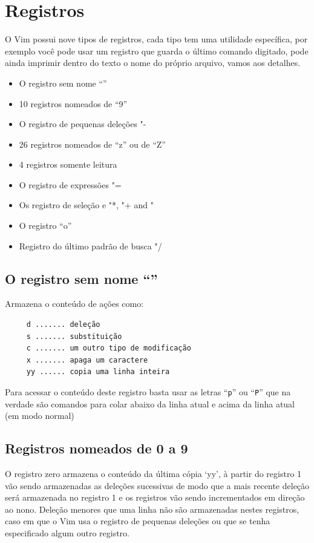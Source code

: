 \documentclass[10pt,a4paper,openany]{book}
\begin{document}
\chapter{Registros}
\label{Registros}

O Vim possui nove tipos de registros, cada tipo tem uma utilidade
específica, por exemplo você pode usar um registro que guarda o último
comando digitado, pode ainda imprimir dentro do texto o nome do
próprio arquivo, vamos aos detalhes.

\begin{itemize}
   \item O registro sem nome ``''
   \item 10 registros nomeados de ``9''
   \item O registro de pequenas deleções "-
   \item 26 registros nomeados de ``z'' ou de ``Z''
   \item 4 registros somente leitura
   \item O registro de expressões "=
   \item Os registro de seleção e  "*, "+ and "~
   \item O registro ``o''
   \item Registro do último padrão de busca "/
\end{itemize}

\section{O registro sem nome ``''}
\label{O registro sem nome ``''}

Armazena o conteúdo de ações como:

\begin{verbatim}
     d ....... deleção
     s ....... substituição
     c ....... um outro tipo de modificação
     x ....... apaga um caractere
     yy ...... copia uma linha inteira
\end{verbatim}

Para acessar o conteúdo deste registro basta usar as letras ``{\tt p}'' ou ``{\tt P}'' que
na verdade são comandos para colar abaixo da linha atual e acima da
linha atual (em modo normal)

\section{Registros nomeados de 0 a 9}
\label{Registros nomeados de 0 a 9}

O registro zero armazena o conteúdo da última cópia `yy', à partir do
registro 1 vão sendo armazenadas as deleções sucessivas de modo que a
mais recente deleção será armazenada no registro 1 e os registros vão
sendo incrementados em direção ao nono.  Deleção menores que uma linha
não são armazenadas nestes registros, caso em que o Vim usa o registro
de pequenas deleções ou que se tenha especificado algum outro
registro.
\end{document}
